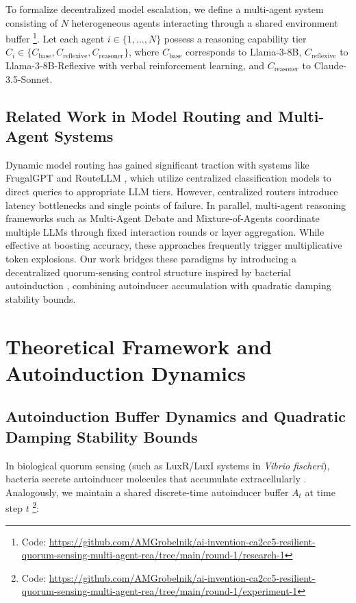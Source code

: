 \documentclass[11pt,letterpaper]{article}
\begin{document}
To formalize decentralized model escalation, we define a multi-agent system consisting of $N$ heterogeneous agents interacting through a shared environment buffer \footnote{Code: \url{https://github.com/AMGrobelnik/ai-invention-ca2cc5-resilient-quorum-sensing-multi-agent-rea/tree/main/round-1/research-1}}. Let each agent $i \in \{1, \dots, N\}$ possess a reasoning capability tier $C_i \in \{C_{\text{base}}, C_{\text{reflexive}}, C_{\text{reasoner}}\}$, where $C_{\text{base}}$ corresponds to Llama-3-8B, $C_{\text{reflexive}}$ to Llama-3-8B-Reflexive with verbal reinforcement learning, and $C_{\text{reasoner}}$ to Claude-3.5-Sonnet.

\subsection{Related Work in Model Routing and Multi-Agent Systems}
Dynamic model routing has gained significant traction with systems like FrugalGPT \citep{Chen2023} and RouteLLM \citep{Wang2024}, which utilize centralized classification models to direct queries to appropriate LLM tiers. However, centralized routers introduce latency bottlenecks and single points of failure. In parallel, multi-agent reasoning frameworks such as Multi-Agent Debate \citep{Du2023} and Mixture-of-Agents \citep{Wang2024} coordinate multiple LLMs through fixed interaction rounds or layer aggregation. While effective at boosting accuracy, these approaches frequently trigger multiplicative token explosions. Our work bridges these paradigms by introducing a decentralized quorum-sensing control structure inspired by bacterial autoinduction \citep{Miller2001}, combining autoinducer accumulation with quadratic damping stability bounds.

\section{Theoretical Framework and Autoinduction Dynamics}

\subsection{Autoinduction Buffer Dynamics and Quadratic Damping Stability Bounds}
In biological quorum sensing (such as LuxR/LuxI systems in \emph{Vibrio fischeri}), bacteria secrete autoinducer molecules that accumulate extracellularly \citep{Miller2001}. Analogously, we maintain a shared discrete-time autoinducer buffer $A_t$ at time step $t$ \footnote{Code: \url{https://github.com/AMGrobelnik/ai-invention-ca2cc5-resilient-quorum-sensing-multi-agent-rea/tree/main/round-1/experiment-1}}:
\end{document}
